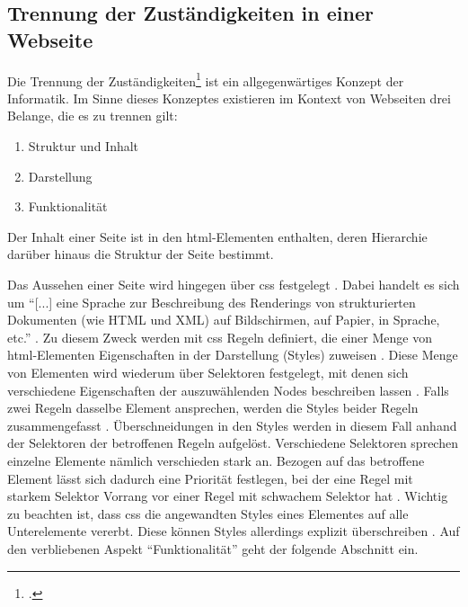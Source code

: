         \subsection{Trennung der Zuständigkeiten in einer Webseite}
            Die Trennung der Zuständigkeiten\footcite[vgl.][]{huersch:SeparationOfConcerns}
            ist ein allgegenwärtiges Konzept der Informatik.
            Im Sinne dieses Konzeptes existieren im Kontext von Webseiten
            drei Belange, die es zu trennen gilt:

            \begin{enumerate}
                \item Struktur und Inhalt
                \item Darstellung
                \item Funktionalität
            \end{enumerate}

            Der Inhalt einer Seite ist in den \gls{html}-Elementen enthalten,
            deren Hierarchie darüber hinaus die Struktur der Seite bestimmt.
            
            Das Aussehen einer Seite wird hingegen über \gls{css} festgelegt \cite{w3c:css}.
            Dabei handelt es sich um "`[...] eine Sprache zur Beschreibung des Renderings
            von strukturierten Dokumenten (wie HTML und XML) auf Bildschirmen, auf Papier,
            in Sprache, etc."' \cite{w3c:css}.
            Zu diesem Zweck werden mit \gls{css} Regeln definiert,
            die einer Menge von \gls{html}-Elementen Eigenschaften in der Darstellung (Styles) zuweisen
            \cite{w3c:cssSyntax}.
            Diese Menge von Elementen wird wiederum über Selektoren festgelegt,
            mit denen sich verschiedene Eigenschaften der auszuwählenden Nodes beschreiben lassen
            \cite{w3c:cssSelectors}.
            Falls zwei Regeln dasselbe Element ansprechen,
            werden die Styles beider Regeln zusammengefasst
            \cite{w3c:cssCascading}.
            Überschneidungen in den Styles werden in diesem Fall anhand der Selektoren der betroffenen Regeln aufgelöst.
            Verschiedene Selektoren sprechen einzelne Elemente nämlich verschieden stark an.
            Bezogen auf das betroffene Element lässt sich dadurch eine Priorität festlegen,
            bei der eine Regel mit starkem Selektor Vorrang vor einer Regel mit schwachem Selektor hat
            \cite{w3c:cssSelectors}. 
            Wichtig zu beachten ist, dass \gls{css} die angewandten Styles eines Elementes auf alle Unterelemente vererbt.
            Diese können Styles allerdings explizit überschreiben
            \cite{w3c:cssCascading}.
            Auf den verbliebenen Aspekt "`Funktionalität"' geht der folgende Abschnitt ein.


